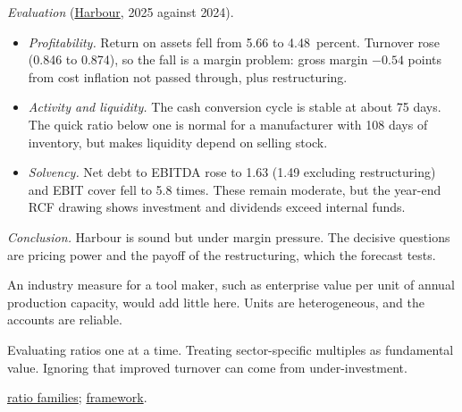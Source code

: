 \begin{qfmethod}
 \emph{Evaluation} (\hyperref[ex:harbour-tools-statements]{Harbour}, 2025 against 2024).
\begin{itemize}
\item \emph{Profitability.} Return on assets fell from 5.66 to 4.48~percent. Turnover rose (0.846 to 0.874), so the fall is a margin problem: gross margin $-0.54$ points from cost inflation not passed through, plus restructuring.
\item \emph{Activity and liquidity.} The cash conversion cycle is stable at about 75 days. The quick ratio below one is normal for a manufacturer with 108 days of inventory, but makes liquidity depend on selling stock.
\item \emph{Solvency.} Net debt to EBITDA rose to 1.63 (1.49 excluding restructuring) and EBIT cover fell to 5.8 times. These remain moderate, but the year-end RCF drawing shows investment and dividends exceed internal funds.
\end{itemize}
\emph{Conclusion.} Harbour is sound but under margin pressure. The decisive questions are pricing power and the payoff of the restructuring, which the forecast tests.

An industry measure for a tool maker, such as enterprise value per unit of annual production capacity, would add little here. Units are heterogeneous, and the accounts are reliable.

 Evaluating ratios one at a time. Treating sector-specific multiples as fundamental value. Ignoring that improved turnover can come from under-investment.

 \hyperref[meth:financial-ratio-families]{ratio families}; \hyperref[def:statement-analysis-framework]{framework}.

\end{qfmethod}

